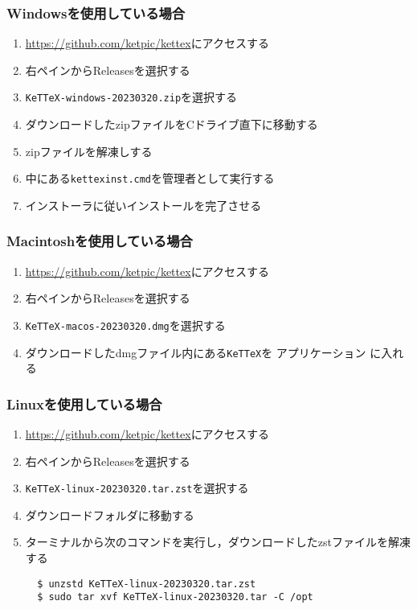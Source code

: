 \subsubsection{Windowsを使用している場合}
\begin{enumerate}
    \item \url{https://github.com/ketpic/kettex}にアクセスする
    \item 右ペインからReleasesを選択する
    \item \verb|KeTTeX-windows-20230320.zip|を選択する
    \item ダウンロードしたzipファイルをCドライブ直下に移動する
    \item zipファイルを解凍しする
    \item 中にある\verb|kettexinst.cmd|を管理者として実行する
    \item インストーラに従いインストールを完了させる
\end{enumerate}

\subsubsection{Macintoshを使用している場合}
\begin{enumerate}
    \item \url{https://github.com/ketpic/kettex}にアクセスする
    \item 右ペインからReleasesを選択する
    \item \verb|KeTTeX-macos-20230320.dmg|を選択する
    \item ダウンロードしたdmgファイル内にある\verb|KeTTeX|を アプリケーション に入れる
\end{enumerate}

\newpage

\subsubsection{Linuxを使用している場合}
\begin{enumerate}
    \item \url{https://github.com/ketpic/kettex}にアクセスする
    \item 右ペインからReleasesを選択する
    \item \verb|KeTTeX-linux-20230320.tar.zst|を選択する
    \item ダウンロードフォルダに移動する
    \item ターミナルから次のコマンドを実行し，ダウンロードしたzstファイルを解凍する
    \begin{lstlisting}
  $ unzstd KeTTeX-linux-20230320.tar.zst
  $ sudo tar xvf KeTTeX-linux-20230320.tar -C /opt
    \end{lstlisting}
\end{enumerate}

